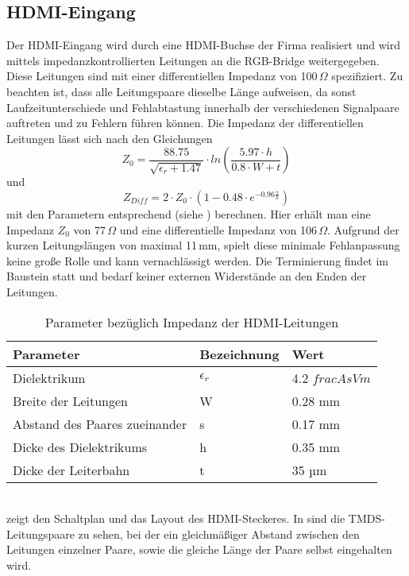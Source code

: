 \subsection{HDMI-Eingang}
\label{cha:hdmi_eingang}
Der HDMI-Eingang wird durch eine HDMI-Buchse der Firma  realisiert und wird mittels impedanzkontrollierten Leitungen an die RGB-Bridge weitergegeben. Diese Leitungen sind mit einer differentiellen Impedanz von 100\,$\Omega$ spezifiziert. Zu beachten ist, dass alle Leitungspaare dieselbe Länge aufweisen, da sonst Laufzeitunterschiede und Fehlabtastung innerhalb der verschiedenen Signalpaare auftreten und zu Fehlern führen können. Die Impedanz der differentiellen Leitungen lässt sich nach den Gleichungen 
%
\begin{equation}
Z_0 = \frac{88.75}{\sqrt{\epsilon_r + 1.47}} \cdot ln\left(\frac{5.97 \cdot h}{0.8 \cdot W + t}\right)
\label{equ:z_0}
\end{equation}
%
und
%
\begin{equation}
Z_{Diff} = 2 \cdot Z_0  \cdot \left(1-0.48 \cdot e^{-0.96\frac{s}{h}}\right)
\label{equ:z_diff}
\end{equation}
%
mit den Parametern entsprechend  (siehe \cite{TI2007}) berechnen. Hier erhält man eine Impedanz $Z_0$ von 77\,$\Omega$ und eine differentielle Impedanz von 106\,$\Omega$. Aufgrund der kurzen Leitungslängen von maximal 11\,mm, spielt diese minimale Fehlanpassung keine große Rolle und kann vernachlässigt werden. Die Terminierung findet im Baustein statt und bedarf keiner externen Widerstände an den Enden der Leitungen.
\begin{table}[h]
\begin{tabular}{|p{7cm}|p{3cm}|p{3cm}|}\hline
\rowcolor{TableBackgroundColor} 
   \textbf{Parameter} & \textbf{Bezeichnung} & \textbf{Wert}	\\ \hline
    Dielektrikum 					& $\epsilon_r$	& 4.2 $frac{As}{Vm}$		\\ \hline
	Breite der Leitungen  		 	& W 			& 0.28 mm	\\ \hline
	Abstand des Paares zueinander 	& s 			& 0.17 mm 	\\ \hline
	Dicke des Dielektrikums 		& h 			& 0.35 mm 	\\ \hline 
	Dicke der Leiterbahn 			& t 			& 35 µm		\\ \hline 
\end{tabular}
\caption{Parameter bezüglich Impedanz der HDMI-Leitungen}
\label{tab:z_parameter}
\end{table} \\
 zeigt den Schaltplan und das Layout des HDMI-Steckeres. In  sind die TMDS-Leitungspaare zu sehen, bei der ein gleichmäßiger Abstand zwischen den Leitungen einzelner Paare, sowie die gleiche Länge der Paare selbst eingehalten wird. 


